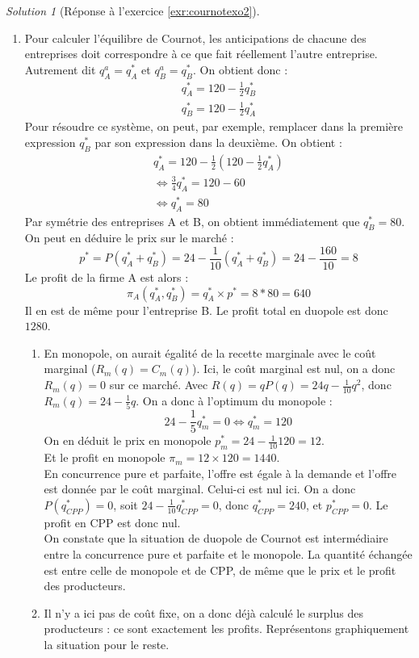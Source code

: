 \documentclass[
]{book}
\providecommand{\tightlist}{%
  \setlength{\itemsep}{0pt}\setlength{\parskip}{0pt}}
\theoremstyle{definition}
\theoremstyle{definition}
\theoremstyle{definition}
\theoremstyle{definition}
\theoremstyle{remark}
\newtheorem*{solution}{Solution}
\begin{document}
\begin{solution}[Réponse à l'exercice \ref{exr:cournotexo2}]
\begin{enumerate}
\def\labelenumi{\alph{enumi}.}
\setcounter{enumi}{3}
\tightlist
\item
  Pour calculer l'équilibre de Cournot, les anticipations de chacune des entreprises doit correspondre à ce que fait réellement l'autre entreprise.
  Autrement dit \(q_A^a=q_A^*\) et \(q_B^a=q_B^*\).
  On obtient donc :
  \begin{gather*}
  q_A^*=120-\frac{1}{2}q_B^*\\
  q_B^*=120-\frac{1}{2}q_A^*
  \end{gather*}
  Pour résoudre ce système, on peut, par exemple, remplacer dans la première expression \(q_B^*\) par son expression dans la deuxième.
  On obtient :
  \begin{gather*}
  q_A^*=120-\frac{1}{2}\left(120-\frac{1}{2}q_A^*\right) \\
  \Leftrightarrow \frac{3}{4}q_A^*=120-60\\
  \Leftrightarrow q_A^*=80
  \end{gather*}
  Par symétrie des entreprises A et B, on obtient immédiatement que \(q_B^*=80\).
  On peut en déduire le prix sur le marché :
  \[p^*=P(q_A^*+q_B^*)=24-\frac{1}{10}(q_A^*+q_B^*)=24-\frac{160}{10}=8\]
  Le profit de la firme A est alors :
  \[\pi_A(q_A^*, q_B^*)=q_A^*\times p^*=8*80=640\]
  Il en est de même pour l'entreprise B.
  Le profit total en duopole est donc \(1280\).

  \begin{enumerate}
  \def\labelenumii{\alph{enumii}.}
  \setcounter{enumii}{4}
  \tightlist
  \item
    En monopole, on aurait égalité de la recette marginale avec le coût marginal (\(R_m(q)=C_m(q)\)).
    Ici, le coût marginal est nul, on a donc \(R_m(q)=0\) sur ce marché.
    Avec \(R(q)=qP(q)=24q-\frac{1}{10}q^2\), donc \(R_m(q)=24-\frac{1}{5}q\).
    On a donc à l'optimum du monopole :
    \[24-\frac{1}{5}q^*_m=0\Leftrightarrow q_m^*=120\]
    On en déduit le prix en monopole \(p_m^*=24-\frac{1}{10}120=12\).\\
    Et le profit en monopole \(\pi_m=12\times 120=1440\).\\
    En concurrence pure et parfaite, l'offre est égale à la demande et l'offre est donnée par le coût marginal.
    Celui-ci est nul ici.
    On a donc \(P(q^*_{CPP})=0\), soit \(24-\frac{1}{10}q^*_{CPP}=0\), donc \(q_{CPP}^*=240\), et \(p_{CPP}^*=0\).
    Le profit en CPP est donc nul.\\
    On constate que la situation de duopole de Cournot est intermédiaire entre la concurrence pure et parfaite et le monopole.
    La quantité échangée est entre celle de monopole et de CPP, de même que le prix et le profit des producteurs.
  \item
    Il n'y a ici pas de coût fixe, on a donc déjà calculé le surplus des producteurs : ce sont exactement les profits.
    Représentons graphiquement la situation pour le reste.
  \end{enumerate}
\end{enumerate}


\end{solution}
\end{document}
